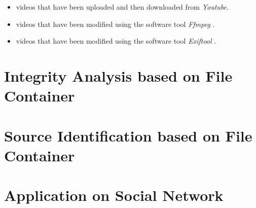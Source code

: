 \begin{itemize}
\item videos that have been uploaded and then downloaded from 	\emph{Youtube}.
\item videos that have been modified using the software tool \emph{Ffmpeg} \cite{}.
\item videos that have been modified using the software tool \emph{Exiftool} \cite{}.
\end{itemize}

\section{Integrity Analysis based on File Container}


\section{Source Identification based on File Container}


\section{Application on Social Network}